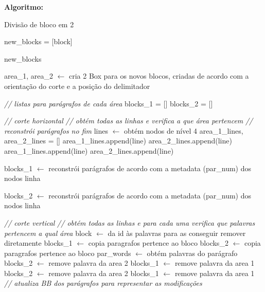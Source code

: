 \textbf{Algoritmo:}

\begin{breakablealgorithm}
	\caption{Divisão de bloco em 2}
	\scriptsize
	\begin{algorithmic}[1]
		
		\STATE new\_blocks = [block]
		
			\RETURN new\_blocks
		\ENDIF
		
		\STATE area\_1, area\_2 $\leftarrow$ cria 2 Box para os novos blocos, criadas de acordo com a orientação do corte e a posição do delimitador
		
		\STATE \textit{// listas para parágrafos de cada área}
		\STATE blocks\_1 = []
		\STATE blocks\_2 = []
		
		\STATE \textit{// corte horizontal}
		\STATE \textit{// obtém todas as linhas e verifica a que área pertencem}
		\STATE \textit{// reconstrói parágrafos no fim}
			\STATE lines $\leftarrow$ obtém nodos de nível 4
			\STATE area\_1\_lines, area\_2\_lines = []
					\STATE area\_1\_lines.append(line)
					\STATE area\_2\_lines.append(line)
						\STATE area\_1\_lines.append(line)
					\ELSE
						\STATE area\_2\_lines.append(line)
					\ENDIF
				\ENDIF
			\ENDFOR
			
				\STATE blocks\_1 $\leftarrow$ reconstrói parágrafos de acordo com a metadata (par\_num) dos nodos linha
			\ENDIF
			
			\STATE blocks\_2 $\leftarrow$ reconstrói parágrafos de acordo com a metadata (par\_num) dos nodos linha
			\ENDIF
		
		\ELSE
			\STATE \textit{// corte vertical}
			\STATE \textit{// obtém todas as linhas e para cada uma verifica que palavras pertencem a qual área}
			\STATE block $\leftarrow$ da id às palavras para as conseguir remover diretamente
			\STATE blocks\_1 $\leftarrow$ copia paragrafos pertence ao bloco
			\STATE blocks\_2 $\leftarrow$ copia paragrafos pertence ao bloco
				\STATE par\_words $\leftarrow$ obtém palavras do parágrafo
						\STATE blocks\_2 $\leftarrow$ remove palavra da area 2
						\STATE blocks\_1 $\leftarrow$ remove palavra da area 1
							\STATE blocks\_2 $\leftarrow$ remove palavra da area 2
						\ELSE
							\STATE blocks\_1 $\leftarrow$ remove palavra da area 1
						\ENDIF
					\ENDIF
				\ENDFOR
				\STATE \textit{// atualiza BB dos parágrafos para representar as modificações}
			\ENDFOR
		\ENDIF
		

\end{algorithmic}
\end{breakablealgorithm}
